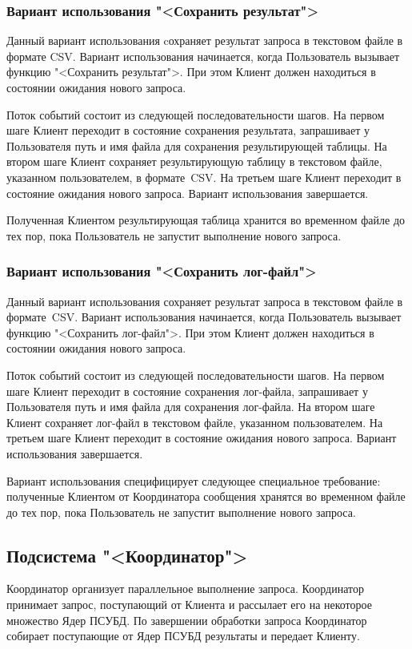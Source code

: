 \documentclass[11pt,oneside]{article}
\begin{document}
	\subsubsection{Вариант использования "<Сохранить результат">}
	Данный вариант использования cохраняет результат запроса в текстовом файле в формате CSV. Вариант использования начинается, когда Пользователь вызывает функцию "<Сохранить результат">. При этом Клиент должен находиться в состоянии ожидания нового запроса.
	\par Поток событий состоит из следующей последовательности шагов. На первом шаге Клиент переходит в состояние сохранения результата, запрашивает у Пользователя путь и имя файла для сохранения результирующей таблицы. На втором шаге Клиент сохраняет результирующую таблицу в текстовом файле, указанном пользователем, в формате~CSV. На третьем шаге Клиент переходит в состояние ожидания нового запроса. Вариант использования завершается.
	\par Полученная Клиентом результирующая таблица хранится во временном файле до тех пор, пока Пользователь не запустит выполнение нового запроса.
	
	\subsubsection{Вариант использования "<Сохранить лог-файл">}
	Данный вариант использования сохраняет результат запроса в текстовом файле в формате~CSV. Вариант использования начинается, когда Пользователь вызывает функцию "<Сохранить лог-файл">. При этом Клиент должен находиться в состоянии ожидания нового запроса.
	\par Поток событий состоит из следующей последовательности шагов. На первом шаге Клиент переходит в состояние сохранения лог-файла, запрашивает у Пользователя путь и имя файла для сохранения лог-файла. На втором шаге Клиент сохраняет лог-файл в текстовом файле, указанном пользователем. На третьем шаге Клиент переходит в состояние ожидания нового запроса. Вариант использования завершается.
	\par Вариант использования специфицирует следующее специальное требование: полученные Клиентом от Координатора сообщения хранятся во временном файле до тех пор, пока Пользователь не запустит выполнение нового запроса.
	
	\subsection{Подсистема "<Координатор">}\label{S_Coordinator}
	\par Координатор организует параллельное выполнение запроса. Координатор принимает запрос, поступающий от Клиента и рассылает его на некоторое множество Ядер ПСУБД. По завершении обработки запроса Координатор собирает поступающие от Ядер ПСУБД результаты и передает Клиенту.
\end{document}
